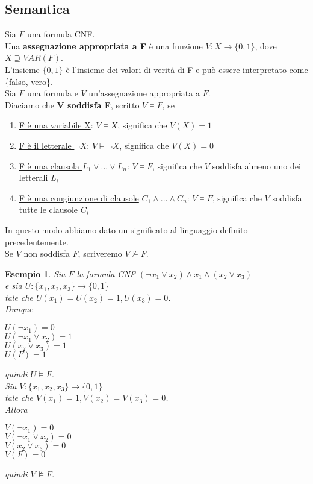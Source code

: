 \documentclass[a4paper,12pt]{article}
\theoremstyle{def}
\theoremstyle{prop}
\theoremstyle{esempio}
\newtheorem*{example}{Esempio}
\theoremstyle{dimostrazione}
\theoremstyle{teo}
\theoremstyle{osservazione}
\begin{document}
\subsection{Semantica}
Sia \(F\) una formula CNF.\\
Una \textbf{assegnazione appropriata a F} è una funzione \(V: X \rightarrow \{0,1\}\), dove \(X \supseteq VAR(F)\).\\
L'insieme \(\{0,1\}\) è l'insieme dei valori di verità di F e può essere interpretato come \{falso, vero\}.\\
Sia \(F\) una formula e \(V\) un'assegnazione appropriata a \(F\).\\
Diaciamo che \textbf{V soddisfa F}, scritto \(V \vDash F\), se
\begin{enumerate}
	\item \underline{F è una variabile X}: \(V \vDash X\), significa che \(V(X) = 1\)
	\item \underline{F è il letterale \(\neg X\)}: \(V \vDash \neg X\), significa che \(V(X) = 0\)
	\item \underline{F è una clausola \(L_1 \lor ... \lor L_n\)}: \(V \vDash F\), significa che \(V\) soddisfa almeno uno dei letterali \(L_i\)
	\item \underline{F è una congiunzione di clausole} \(C_1 \land ... \land C_n\): \(V \vDash F\), significa che \(V\) soddisfa tutte le clausole \(C_i\)
\end{enumerate}
In questo modo abbiamo dato un significato al linguaggio definito precedentemente.\\
Se \(V\) non soddisfa \(F\), scriveremo \(V \nvDash F\).
\begin{example}
	Sia \(F\) la formula CNF \((\neg x_1 \lor x_2) \land x_1 \land (x_2 \lor x_3)\)\\
	e sia \(U: \{x_1,x_2,x_3\} \rightarrow \{0,1\}\)\\
	tale che \(U(x_1) = U(x_2) = 1, U(x_3) = 0\).\\
	Dunque
	\begin{center}
		\(U(\neg x_1) = 0\)\\
		\(U(\neg x_1 \lor x_2) = 1\)\\
		\(U(x_2 \lor x_3) = 1\)\\
		\(U(F) = 1\)
	\end{center}
	quindi \(U \vDash F\).\\
	Sia \(V: \{x_1,x_2,x_3\} \rightarrow \{0,1\}\)\\
	tale che \(V(x_1) = 1, V(x_2) = V(x_3) = 0\).\\
	Allora
	\begin{center}
		\(V(\neg x_1) = 0\)\\
		\(V(\neg x_1 \lor x_2) = 0\)\\
		\(V(x_2 \lor x_3) = 0\)\\
		\(V(F) = 0\)
	\end{center}
	quindi \(V \nvDash F\).
\end{example}
\end{document}
